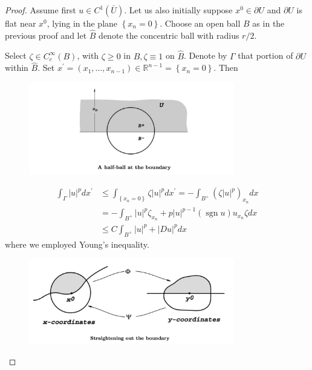 \begin{proof}
     Assume first $u \in C^{1}(\bar{U})$. Let us also initially suppose $x^{0} \in \partial U$ and $\partial U$ is flat near $x^{0}$, lying in the plane $\left\{x_{n}=0\right\}$. Choose an open ball $B$ as in the previous proof and let $\hat{B}$ denote the concentric ball with radius $r / 2$.

     Select $\zeta \in C_{c}^{\infty}(B)$, with $\zeta \geq 0$ in $B, \zeta \equiv 1$ on $\hat{B}$. Denote by $\Gamma$ that portion of $\partial U$ within $\hat{B}$. Set $x^{\prime}=\left(x_{1}, \ldots, x_{n-1}\right) \in \mathbb{R}^{n-1}=\left\{x_{n}=0\right\}$.
Then
\begin{figure}[H]
    \centering
    \includegraphics[width=0.8\textwidth]{figures/half-ball-boundary.png}
\end{figure}
$$
\begin{aligned}
\int_{\Gamma}|u|^{p} d x^{\prime} & \leq \int_{\left\{x_{n}=0\right\}} \zeta|u|^{p} d x^{\prime}=-\int_{B^{+}}\left(\zeta|u|^{p}\right)_{x_{n}} d x \\
&=-\int_{B^{+}}|u|^{p} \zeta_{x_{n}}+p|u|^{p-1}(\operatorname{sgn} u) u_{x_{n}} \zeta d x \\
& \leq C \int_{B^{+}}|u|^{p}+|D u|^{p} d x
\end{aligned}
$$
where we employed Young's inequality.
\begin{figure}[H]
    \centering
    \includegraphics[width=0.8\textwidth]{figures/Straightening-boundary.png}
\end{figure}
\end{proof}

